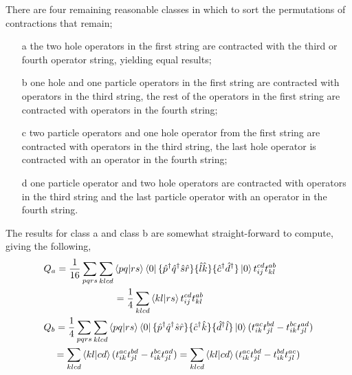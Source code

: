 There are four remaining reasonable classes in which to sort the
permutations of contractions that remain;
\begin{itemize}
    \item[a] the two hole operators in the first string are
    contracted with the third or fourth operator string, yielding 
    equal results;
    \item[b] one hole and one particle operators in the first string
    are contracted with operators in the third string, the rest of
    the operators in the first string are contracted with operators 
    in the fourth string;
    \item[c] two particle operators and one hole operator from the 
    first string are contracted with operators in the third string,
    the last hole operator is contracted with an operator in the 
    fourth string;
   \item[d] one particle operator and two hole operators are contracted 
    with operators in the third string and the last particle operator 
    with an operator in the fourth string.
\end{itemize}
The results for class a and class b are somewhat straight-forward to 
compute, giving the following,
\begin{align}
    &\begin{gathered}
        Q_a = \frac{1}{16}\sum_{pqrs}\sum_{klcd} 
        \bra{pq} \ket{rs}\bra{0}
            \{\hat{p}^\dagger \hat{q}^\dagger \hat{s} \hat{r} \}
            \{\hat{l} \hat{k} \}
            \{\hat{c}^\dagger \hat{d}^\dagger \}
        \ket{0} t^{cd}_{ij} t^{ab}_{kl} \\
        = \frac{1}{4} \sum_{klcd}
        \bra{kl} \ket{rs} t^{cd}_{ij} t^{ab}_{kl}
    \end{gathered} \\
    &\begin{gathered}
        Q_b = \frac{1}{4}\sum_{pqrs} \sum_{klcd}
        \bra{pq} \ket{rs} \bra{0}
            \{\hat{p}^\dagger \hat{q}^\dagger \hat{s} \hat{r} \}
            \{\hat{c}^\dagger \hat{k} \}
            \{\hat{d}^\dagger \hat{l} \}
            \ket{0}
            (t^{ac}_{ik}t^{bd}_{jl} - t^{bc}_{ik}t^{ad}_{jl}) \\
        = \sum_{klcd} \bra{kl} \ket{cd}
            (t^{ac}_{ik}t^{bd}_{jl} - t^{bc}_{ik}t^{ad}_{jl})
        = \sum_{klcd} \bra{kl} \ket{cd}
            (t^{ac}_{ik}t^{bd}_{jl} - t^{bd}_{ik}t^{ac}_{jl})
    \end{gathered}
\end{align}

